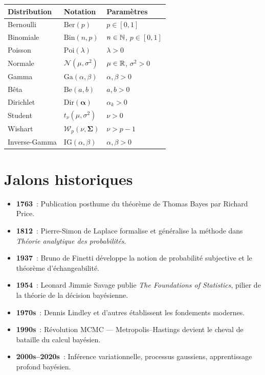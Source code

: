 \begin{center}
\renewcommand{\arraystretch}{1.3}
\begin{tabular}{lll}
\toprule
\textbf{Distribution} & \textbf{Notation} & \textbf{Param\`etres} \\
\midrule
Bernoulli & $\text{Ber}(p)$ & $p \in [0,1]$ \\
Binomiale & $\text{Bin}(n, p)$ & $n \in \mathbb{N}$, $p \in [0,1]$ \\
Poisson & $\text{Poi}(\lambda)$ & $\lambda > 0$ \\
Normale & $\mathcal{N}(\mu, \sigma^2)$ & $\mu \in \mathbb{R}$, $\sigma^2 > 0$ \\
Gamma & $\text{Ga}(\alpha, \beta)$ & $\alpha, \beta > 0$ \\
B\^eta & $\text{Be}(a, b)$ & $a, b > 0$ \\
Dirichlet & $\text{Dir}(\boldsymbol{\alpha})$ & $\alpha_k > 0$ \\
Student & $t_\nu(\mu, \sigma^2)$ & $\nu > 0$ \\
Wishart & $\mathcal{W}_p(\nu, \boldsymbol{\Sigma})$ & $\nu > p-1$ \\
Inverse-Gamma & $\text{IG}(\alpha, \beta)$ & $\alpha, \beta > 0$ \\
\bottomrule
\end{tabular}
\end{center}

\section*{Jalons historiques}

\begin{itemize}
  \item \textbf{1763}~: Publication posthume du th\'eor\`eme de Thomas Bayes
        par Richard Price.
  \item \textbf{1812}~: Pierre-Simon de Laplace formalise et g\'en\'eralise
        la m\'ethode dans \textit{Th\'eorie analytique des probabilit\'es}.
  \item \textbf{1937}~: Bruno de Finetti d\'eveloppe la notion de
        probabilit\'e subjective et le th\'eor\`eme d'\'echangeabilit\'e.
  \item \textbf{1954}~: Leonard Jimmie Savage publie \textit{The Foundations
        of Statistics}, pilier de la th\'eorie de la d\'ecision bay\'esienne.
  \item \textbf{1970s}~: Dennis Lindley et d'autres \'etablissent les
        fondements modernes.
  \item \textbf{1990s}~: R\'evolution MCMC --- Metropolis--Hastings devient
        le cheval de bataille du calcul bay\'esien.
  \item \textbf{2000s--2020s}~: Inf\'erence variationnelle, processus
        gaussiens, apprentissage profond bay\'esien.
\end{itemize}

